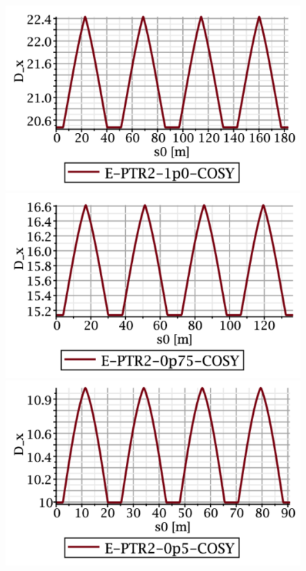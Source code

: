 \documentclass[]{article}
\begin{document}
%
\begin{figure}[htbp]
\begin{minipage}[b]{0.45\linewidth}
\centering
\includegraphics[scale=0.4]{pdf/E-PTR2-1p0-COSY-MAPLE-dispersion.pdf}
\includegraphics[scale=0.4]{pdf/E-PTR2-0p75-COSY-MAPLE-dispersion.pdf}
\includegraphics[scale=0.4]{pdf/E-PTR2-0p5-COSY-MAPLE-dispersion.pdf}

\end{minipage}
\end{figure}
\end{document}
